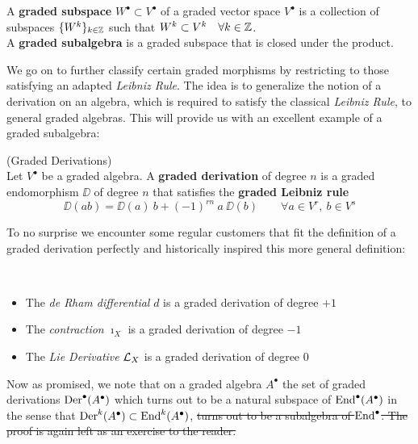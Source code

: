 \begin{definition}
  A \textbf{graded subspace} $W^\bullet \subset V^\bullet$ of a graded vector space $V^\bullet$ is a collection of subspaces $\{ W^k \}_{k\in\mathbb{Z}}$ such that $W^k \subset V^k \quad \forall k \in \mathbb{Z}$.\\
  A \textbf{graded subalgebra} is a graded subspace that is closed under the product.
\end{definition}

We go on to further classify certain graded morphisms by restricting to those satisfying an adapted \emph{Leibniz Rule}. The idea is to generalize the notion of a derivation on an algebra, which is required to satisfy the classical \emph{Leibniz Rule}, to general graded algebras. This will provide us with an excellent example of a graded subalgebra:

\begin{definition} (Graded Derivations)\\
  Let $V^\bullet$ be a graded algebra. A \textbf{graded derivation} of degree $n$ is a graded endomorphism $\DD$ of degree $n$ that satisfies the \textbf{graded Leibniz rule}
  $$ \DD (ab) = \DD(a) \ b + (-1)^{rn} \ a \ \DD(b) \quad \quad \forall a \in V^r, \ b \in V^s $$
\end{definition}

To no surprise we encounter some regular customers that fit the definition of a graded derivation perfectly and historically inspired this more general definition:

\begin{example}~
  \begin{itemize}
    \item The \emph{de Rham differential} $d$ is a graded derivation of degree $+1$
    \item The \emph{contraction} $\imath_X$ is a graded derivation of degree $-1$
    \item The \emph{Lie Derivative} $\mathcal{L}_{X}$ is a graded derivation of degree $0$
  \end{itemize}
\end{example}

Now as promised, we note that on a graded algebra $A^\bullet$ the set of graded derivations $\operatorname{Der}^\bullet(A^\bullet)$ which turns out to be a natural subspace of $\operatorname{End}^\bullet(A^\bullet)$ in the sense that $\operatorname{Der}^k(A^\bullet) \subset \operatorname{End}^k(A^\bullet)$, \sout{turns out to be a subalgebra of $\operatorname{End}^\bullet$. The proof is again left as an exercise to the reader.}

